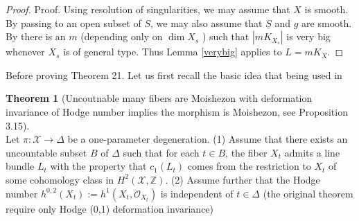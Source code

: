 \documentclass[11pt]{article}
\theoremstyle{definition}
\newtheorem{theorem}{Theorem}
\begin{document}
	\begin{proof}
		Proof. Using resolution of singularities, we may assume that $X$ is smooth. By passing to an open subset of $S$, we may also assume that $\underline{S}$ and $g$ are smooth. By \cite{HaconMckernan} there is an $m$ (depending only on $\operatorname{dim} X_s$ ) such that $\left|m K_{X_s}\right|$ is very big whenever $X_s$ is of general type. Thus Lemma \ref{verybig} applies to $L=m K_X$.
	\end{proof}
	
	Before proving Theorem 21. Let us first recall the basic idea that being used in \cite{RaoTsai}
	\begin{theorem}[Uncoutnable many fibers are Moishezon with deformation invariance of Hodge number implies the morphism is Moishezon, see \cite{RaoTsai} Proposition 3.15]~\\
		
	    Let $\pi: \mathcal{X} \rightarrow \Delta$ be a one-parameter degeneration. 
		(1) Assume that there exists an uncountable subset $B$ of $\Delta$ such that for each $t \in B$, the fiber $X_t$ admits a line bundle $L_t$ with the property that $c_1\left(L_t\right)$ comes from the restriction to $X_t$ of some cohomology class in $H^2(\mathcal{X}, \mathbb{Z})$.
		(2) Assume further that the Hodge number $h^{0,2}\left(X_t\right):=h^1\left(X_t, \mathcal{O}_{X_t}\right)$ is independent of $t \in \Delta$ (the original theorem require only Hodge (0,1) deformation invariance)
	\end{theorem}
\end{document}
